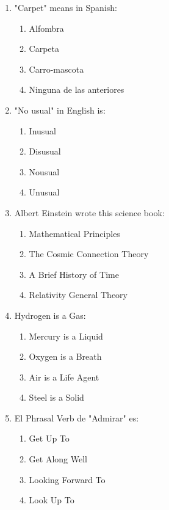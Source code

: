 \documentclass[11pt,a4paper]{article}
\begin{document}
\begin{enumerate}
    \item "Carpet" means in Spanish:
    \begin{enumerate}[label=\alph*.]
        \item Alfombra
        \item Carpeta
        \item Carro-mascota
        \item Ninguna de las anteriores
    \end{enumerate}

    \item "No usual" in English is:
    \begin{enumerate}[label=\alph*.]
        \item Inusual
        \item Disusual
        \item Nousual
        \item Unusual
    \end{enumerate}

    \item Albert Einstein wrote this science book:
    \begin{enumerate}[label=\alph*.]
        \item Mathematical Principles
        \item The Cosmic Connection Theory
        \item A Brief History of Time
        \item Relativity General Theory
    \end{enumerate}

    \item Hydrogen is a Gas:
    \begin{enumerate}[label=\alph*.]
        \item Mercury is a Liquid
        \item Oxygen is a Breath
        \item Air is a Life Agent
        \item Steel is a Solid
    \end{enumerate}

    \item El Phrasal Verb de "Admirar" es:
    \begin{enumerate}[label=\alph*.]
        \item Get Up To
        \item Get Along Well
        \item Looking Forward To
        \item Look Up To
    \end{enumerate}
\end{enumerate}
\end{document}
